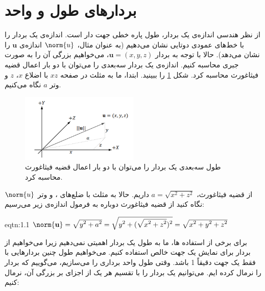 \section{\textbf{بردارهای طول و واحد}}
\label{sec:1.2}
{
    \Large
    \begin{spacing}{1.5}
        از نظر هندسی اندازه‌ی یک بردار، طول پاره خطی جهت دار است.
        اندازه‌ی یک بردار را با خط‌های عمودی دوتایی نشان می‌دهیم
        (به عنوان مثال، $\norm{u}$ اندازه‌ی $\textbf{u}$ را نشان می‌دهد).
        حالا با توجه به بردار $\textbf{u}=(x,y,z)$، می‌خواهیم بزرگی آن را به صورت جبری محاسبه کنیم.
        اندازه‌ی یک بردار سه‌بعدی را می‌توان با دو بار اعمال قضیه فیثاغورث محاسبه کرد.
        شکل \ref{fig:4.Session.1.1.8} را ببینید. ابتدا، ما به مثلث در صفحه $xz$ با اضلاع $x$، $z$ و وتر $a$ نگاه می‌کنیم.

        \begin{figure}[H]
            \centering
            \setlength{\belowcaptionskip}{-10pt}
            \includegraphics[width=0.5\textwidth]{Images/4/1/4.Session.1.1.8}
            \caption{طول سه‌بعدی یک بردار را می‌توان با دو بار اعمال قضیه فیثاغورث محاسبه کرد.}
            \label{fig:4.Session.1.1.8}
        \end{figure}

        از قضیه فیثاغورث، $a=\sqrt{\displaystyle x^2+z^2}$ داریم.
        حالا به مثلث با ضلع‌های ،  و وتر $\norm{u}$ نگاه کنید از قضیه فیثاغورث دوباره به فرمول اندازه‌ی زیر می‌رسیم:

        \begin{eqtn}{eqtn:1.1}
            \centering
            $\norm{\textbf{u}}=\sqrt{\displaystyle y^2+a^2}=\sqrt{\displaystyle y^2+(\sqrt{\displaystyle x^2+z^2})^2}=\sqrt{\displaystyle x^2+y^2+z^2}$
        \end{eqtn}

        برای برخی از استفاده ها، ما به طول یک بردار اهمیتی نمی‌دهیم زیرا می‌خواهیم از بردار برای نمایش یک جهت خالص استفاده کنیم.
        می‌خواهیم طول چنین بردارهایی با فقط یک جهت دقیقاً 1 باشد.
        وقتی طول واحد برداری را می‌سازیم، می‌گوییم که بردار را نرمال کرده ایم.
        می‌توانیم یک بردار را با تقسیم هر یک از اجزای بر بزرگی آن، نرمال کنیم:


\end{spacing}}
